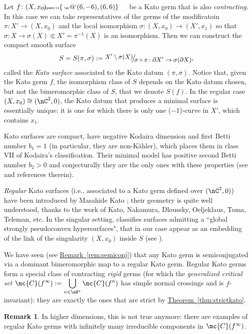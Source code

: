 \documentclass[11 pt, twoside, a4paper]{amsart}
\makeatletter
\def\nfrac#1#2{%
    \raise.5ex\hbox{\small{$#1$}}%
    \kern-.18em\big/\kern-.2em%
    \lower.5ex\hbox{\small{$#2$}}}
\newcommand{\Kpi}{{\pi}} %
\newcommand{\Ksigma}{{\sigma}} %
\newcommand{\selfarrow}[1][]{\tiny{\!\!\!\xymatrix{\phantom{|}\ar@`{(6,-6),(6,6)}}\hspace{4mm}}}
\theoremstyle{definition}
\newtheorem{rem}[thm]{Remark}
\theoremstyle{definition}
\newcommand{\subrelcpct}{\Subset}
\newcommand{\refthm}[1]{\hyperref[thm:#1]{Theorem~\ref*{thm:#1}}}
\newcommand{\refrem}[1]{\hyperref[rem:#1]{Remark~\ref*{rem:#1}}}
\makeatother
\begin{document}
Let $f \colon (X,x_0) \selfarrow$ be a Kato germ that is also \emph{contracting}. In this case we can take representatives of the germs of the modificatoin $\Kpi \colon X' \to (X,x_0)$ and the local isomorphism $\Ksigma \colon (X,x_0) \to (X',x_1)$
so that $\Ksigma \colon X \to \Ksigma(X) \subrelcpct X'=\Kpi^{-1}(X)$ is an isomorphism.
Then we can construct the compact smooth surface
\[
S=S(\Kpi,\Ksigma):=\nfrac{X' \setminus \Ksigma(X)}{\Ksigma \circ \Kpi \colon \partial X' \to \Ksigma(\partial X)}\text{,}
\]
called the \emph{Kato surface} associated to the Kato datum $(\Kpi,\Ksigma)$.
Notice that, given the Kato germ $f$, the isomorphism class of $S$ depends on the Kato datum chosen, but not the bimeromorphic class of $S$, that we denote $S(f)$.
In the regular case $(X,x_0)\cong(\nC^2,0)$, the Kato datum that produces a minimal surface is essentially unique: it is one for which there is only one ($-1$)-curve in $X'$, which contains $x_1$.

Kato surfaces are compact, have negative Kodaira dimension and first Betti number $b_1=1$ (in particular, they are non-K\"ahler), which places them in class \textup{VII} of Kodaira's classification.
Their minimal model has positive second Betti number $b_2>0$ and conjecturally they are the only ones with these properties (see \cite{teleman:towardsclassification} and references therein).

\emph{Regular} Kato surfaces (i.e., associated to a Kato germ defined over $(\nC^2,0)$) have been introduced by Masahide Kato \cite{kato:cptcplxmanifoldsGSS}; their geometry is quite well understood, thanks to the work of Kato, Nakamura, Dloussky, Oeljeklaus, Toma, Teleman, etc.
In the singular setting, \cite{kato:cpctcplxsurfwithGSPH} classifies surfaces admitting a ``global strongly pseudoconvex hypersurfaces", that in our case appear as an embedding of the link of the singularity $(X,x_0)$ inside $S$ (see \cite[Theorems B and C]{fantini-favre-ruggiero:sandwichselfsim}).

We have seen (see \refrem{semiconj}) that any Kato germ is semiconjugated via a dominant bimeromorphic map to a regular Kato germ.
Regular Kato germs form a special class of contracting \emph{rigid} germs (for which the \emph{generalized critical set} $\displaystyle \mc{C}(f^\infty):= \bigcup_{n \in \nN^*}\mc{C}(f^n)$ has simple normal crossings and is $f$-invariant): they are exactly the ones that are strict by \refthm{strictkato}.

\begin{rem}
In higher dimensions, this is not true anymore: there are examples of regular Kato germs with infinitely many irreducible components in $\mc{C}(f^\infty)$.
\end{rem}
\end{document}
